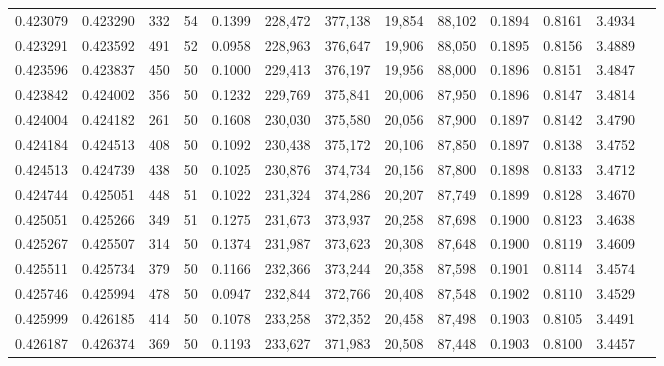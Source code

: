 \begin{tabular}{rrrrrrrrrrrrr}
0.423079 & 0.423290 &   332 &  54 &                                     0.1399 & 228,472 & 377,138 &  19,854 &  88,102 & 0.1894 & 0.8161 & 3.4934 \\
0.423291 & 0.423592 &   491 &  52 &                                     0.0958 & 228,963 & 376,647 &  19,906 &  88,050 & 0.1895 & 0.8156 & 3.4889 \\
0.423596 & 0.423837 &   450 &  50 &                                     0.1000 & 229,413 & 376,197 &  19,956 &  88,000 & 0.1896 & 0.8151 & 3.4847 \\
0.423842 & 0.424002 &   356 &  50 &                                     0.1232 & 229,769 & 375,841 &  20,006 &  87,950 & 0.1896 & 0.8147 & 3.4814 \\
0.424004 & 0.424182 &   261 &  50 &                                     0.1608 & 230,030 & 375,580 &  20,056 &  87,900 & 0.1897 & 0.8142 & 3.4790 \\
0.424184 & 0.424513 &   408 &  50 &                                     0.1092 & 230,438 & 375,172 &  20,106 &  87,850 & 0.1897 & 0.8138 & 3.4752 \\
0.424513 & 0.424739 &   438 &  50 &                                     0.1025 & 230,876 & 374,734 &  20,156 &  87,800 & 0.1898 & 0.8133 & 3.4712 \\
0.424744 & 0.425051 &   448 &  51 &                                     0.1022 & 231,324 & 374,286 &  20,207 &  87,749 & 0.1899 & 0.8128 & 3.4670 \\
0.425051 & 0.425266 &   349 &  51 &                                     0.1275 & 231,673 & 373,937 &  20,258 &  87,698 & 0.1900 & 0.8123 & 3.4638 \\
0.425267 & 0.425507 &   314 &  50 &                                     0.1374 & 231,987 & 373,623 &  20,308 &  87,648 & 0.1900 & 0.8119 & 3.4609 \\
0.425511 & 0.425734 &   379 &  50 &                                     0.1166 & 232,366 & 373,244 &  20,358 &  87,598 & 0.1901 & 0.8114 & 3.4574 \\
0.425746 & 0.425994 &   478 &  50 &                                     0.0947 & 232,844 & 372,766 &  20,408 &  87,548 & 0.1902 & 0.8110 & 3.4529 \\
0.425999 & 0.426185 &   414 &  50 &                                     0.1078 & 233,258 & 372,352 &  20,458 &  87,498 & 0.1903 & 0.8105 & 3.4491 \\
0.426187 & 0.426374 &   369 &  50 &                                     0.1193 & 233,627 & 371,983 &  20,508 &  87,448 & 0.1903 & 0.8100 & 3.4457 \\

\end{tabular}
